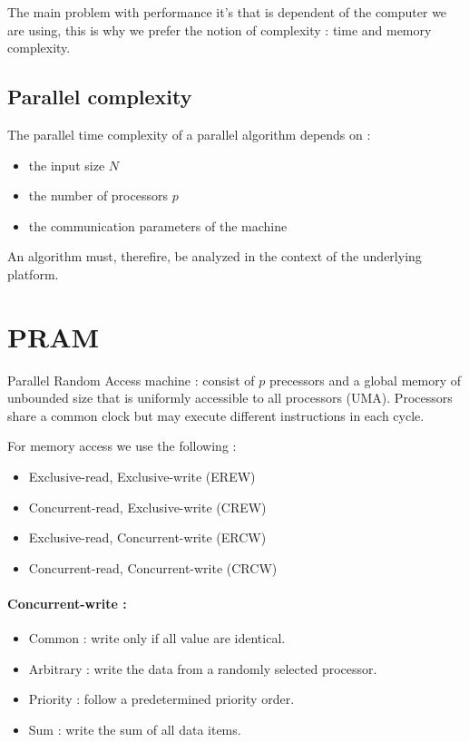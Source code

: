 \documentclass[11pt,a4paper]{report}
\begin{document}
The main problem with performance it's that is dependent of the computer we are using, this is why we prefer the notion of complexity : time and memory complexity.

\subsection{Parallel complexity} %
\label{sub:Parallel complexity}

The parallel time complexity of a parallel algorithm depends on :
\begin{itemize}
    \item the input size $N$
    \item the number of processors $p$
    \item the communication parameters of the machine
\end{itemize}

An algorithm must, therefire, be analyzed in the context of the underlying platform.



\section{PRAM} %
\label{sec:PRAM}

Parallel Random Access machine : consist of $p$ precessors and a global memory of unbounded size that is uniformly accessible to all processors (UMA). Processors share a common clock but may execute different instructions in each cycle.

For memory access we use the following :
\begin{itemize}
    \item Exclusive-read, Exclusive-write (EREW)
    \item Concurrent-read, Exclusive-write (CREW)
    \item Exclusive-read, Concurrent-write (ERCW)
    \item Concurrent-read, Concurrent-write (CRCW)
\end{itemize}

\paragraph{Concurrent-write :}
\begin{itemize}
    \item Common : write only if all value are identical.
    \item Arbitrary : write the data from a randomly selected processor.
    \item Priority : follow a predetermined priority order.
    \item Sum : write the sum of all data items.
\end{itemize}
\end{document}
